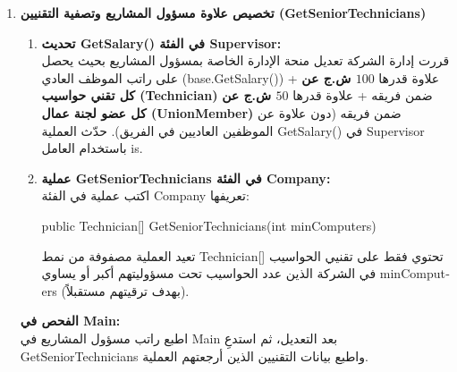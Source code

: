 \documentclass[14pt]{extarticle}
\begin{document}
\begin{enumerate}[label=\textbf{تمرين \arabic*:}, wide=0pt, itemsep=2.2em]
    \item \textbf{تخصيص علاوة مسؤول المشاريع وتصفية التقنيين (\textenglish{GetSeniorTechnicians})}
    \begin{enumerate}[label=\textbf{(\arabic*)}]
        \item \textbf{تحديث \textenglish{GetSalary()} في الفئة \textenglish{Supervisor}:} \\
        قررت إدارة الشركة تعديل منحة الإدارة الخاصة بمسؤول المشاريع بحيث يحصل على راتب الموظف العادي (\textenglish{base.GetSalary()}) + علاوة قدرها \textbf{$100$ ش.ج عن كل تقني حواسيب (\textenglish{Technician})} ضمن فريقه + علاوة قدرها \textbf{$50$ ش.ج عن كل عضو لجنة عمال (\textenglish{UnionMember})} ضمن فريقه (دون علاوة عن الموظفين العاديين في الفريق). حدّث العملية \textenglish{GetSalary()} في \textenglish{Supervisor} باستخدام العامل \textenglish{is}.
        \item \textbf{عملية \textenglish{GetSeniorTechnicians} في الفئة \textenglish{Company}:} \\
        اكتب عملية في الفئة \textenglish{Company} تعريفها:
        \begin{center}
        \textenglish{public Technician[] GetSeniorTechnicians(int minComputers)}
        \end{center}
        تعيد العملية مصفوفة من نمط \textenglish{Technician[]} تحتوي فقط على تقنيي الحواسيب في الشركة الذين عدد الحواسيب تحت مسؤوليتهم أكبر أو يساوي \textenglish{minComputers} (بهدف ترقيتهم مستقبلاً).
    \end{enumerate}
    \textbf{الفحص في \textenglish{Main}:} \\
    اطبع راتب مسؤول المشاريع في \textenglish{Main} بعد التعديل، ثم استدعِ \textenglish{GetSeniorTechnicians} واطبع بيانات التقنيين الذين أرجعتهم العملية.
    \filbreak


\end{enumerate}
\end{document}
